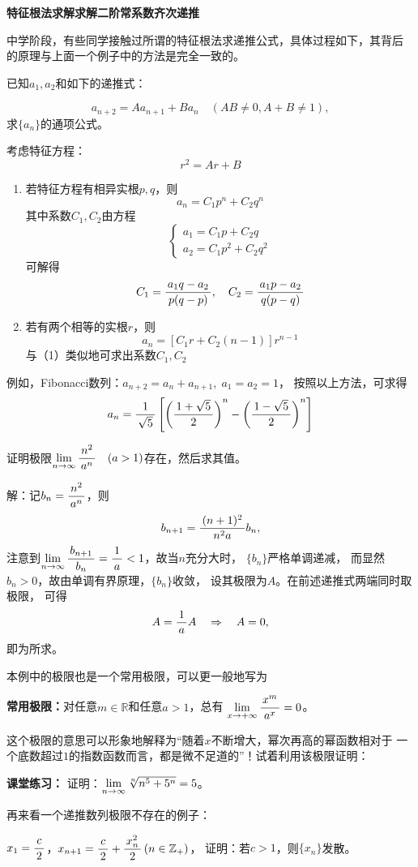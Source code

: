 \begin{shaded}
	{\bf 特征根法求解求解二阶常系数齐次递推}

	中学阶段，有些同学接触过所谓的特征根法求递推公式，具体过程如下，其背后
	的原理与上面一个例子中的方法是完全一致的。

	已知$a_1,a_2$和如下的递推式：

	$$a_{n+2}=Aa_{n+1}+Ba_n\quad (AB\ne 0, A+B\ne 1),$$
	求$\{a_n\}$的通项公式。

	考虑特征方程：
	$$r^2=Ar+B$$
	\begin{enumerate}[(1)]
	  \setlength{\itemindent}{1cm}
	  \item 若特征方程有相异实根$p,q$，则
	  $$a_n=C_1p^n+C_2q^n$$
	  其中系数$C_1,C_2$由方程
	  $$\left\{\begin{array}{l}
	  a_1=C_1p+C_2q\\
	  a_2=C_1p^2+C_2q^2
	  \end{array}\right.$$
	  可解得
	  $$C_1=\displaystyle\frac{\,{a_1q-a_2}\,}{\,{p(q-p)}\,},\quad
	  C_2=\displaystyle\frac{\,{a_1p-a_2}\,}{\,{q(p-q)}\,}$$
	  \item 若有两个相等的实根$r$，则
	  $$a_n=[C_1r+C_2(n-1)]r^{n-1}$$
	  与（1）类似地可求出系数$C_1,C_2$
	\end{enumerate}

	例如，Fibonacci数列：$a_{n+2}=a_n+a_{n+1},\;a_1=a_2=1$，
	按照以上方法，可求得
	$$a_n=\displaystyle\frac{\,{1}\,}{\,{\sqrt5}\,}\left[\left(\displaystyle\frac{\,{1+\sqrt5}\,}{\,{2}\,}\right)^n
	-\left(\displaystyle\frac{\,{1-\sqrt5}\,}{\,{2}\,}\right)^n\right]$$
\end{shaded}

\bs
\egz 证明极限$\lim\limits_{n\to\infty}\displaystyle\frac{\,{n^2}\,}{\,{a^n}\,}\quad (a>1)$存在，然后求其值。

解：记$b_n=\displaystyle\frac{\,{n^2}\,}{\,{a^n}\,}$，则
$$b_{n+1}=\displaystyle\frac{\,{(n+1)^2}\,}{\,{n^2a}\,}b_n,$$
注意到$\lim\limits_{n\to\infty}\displaystyle\frac{\,{b_{n+1}}\,}{\,{b_n}\,}=\displaystyle\frac{\,{1}\,}{\,{a}\,}<1$，故当$n$充分大时，
$\{b_n\}$严格单调递减，
而显然$b_n>0$，故由单调有界原理，$\{b_n\}$收敛，
设其极限为$A$。在前述递推式两端同时取极限，
可得
$$A=\displaystyle\frac{\,{1}\,}{\,{a}\,}A\quad\Rightarrow\quad A=0,$$
即为所求。\fin

本例中的极限也是一个常用极限，可以更一般地写为
\begin{thx}
	{\bf 常用极限：}对任意$m\in\mathbb{R}$和任意$a>1$，总有
	$\lim\limits_{x\to{+\infty}}\displaystyle\frac{\,{x^m}\,}{\,{a^x}\,}=0$。
\end{thx}
这个极限的意思可以形象地解释为“随着$x$不断增大，幂次再高的幂函数相对于
一个底数超过$1$的指数函数而言，都是微不足道的”！试着利用该极限证明：

{\bf 课堂练习：} 证明：$\lim\limits_{n\to\infty}\sqrt[n]{n^5+5^n}=5$。

\bs
再来看一个递推数列极限不存在的例子：

\egz $x_1=\displaystyle\frac{\,{c}\,}{\,{2}\,}$，$x_{n+1}=\displaystyle\frac{\,{c}\,}{\,{2}\,}+\displaystyle\frac{\,{x_n^2}\,}{\,{2}\,}\,(n\in\mathbb{Z}_+)$，
证明：若$c>1$，则$\{x_n\}$发散。

